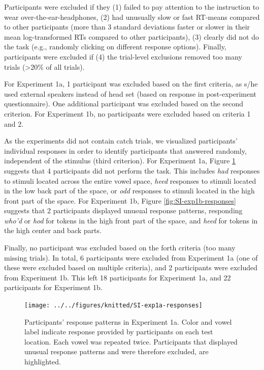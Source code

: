 \documentclass[preprint]{JASA}
\begin{document}
Participants were excluded if they (1) failed to pay attention to the instruction to wear over-the-ear-headphones, (2) had unusually slow or fast RT-means compared to other participants (more than 3 standard deviations faster or slower in their mean log-transformed RTs compared to other participants), (3) clearly did not do the task (e.g., randomly clicking on different response options). Finally, participants were excluded if (4) the trial-level exclusions removed too many trials (\textgreater20\% of all trials).

For Experiment 1a, 1 participant was excluded based on the first criteria, as s/he used external speakers instead of head set (based on response in post-experiment questionnaire). One additional participant was excluded based on the second criterion. For Experiment 1b, no participants were excluded based on criteria 1 and 2.

As the experiments did not contain catch trials, we visualized participants' individual responses in order to identify participants that answered randomly, independent of the stimulus (third criterion). For Experiment 1a, Figure \ref{fig:SI-exp1a-responses} suggests that 4 participants did not perform the task. This includes \emph{had} responses to stimuli located across the entire vowel space, \emph{heed} responses to stimuli located in the low back part of the space, or \emph{odd} responses to stimuli located in the high front part of the space. For Experiment 1b, Figure \ref{fig:SI-exp1b-responses} suggests that 2 participants displayed unusual response patterns, responding \emph{who'd} or \emph{hod} for tokens in the high front part of the space, and \emph{heed} for tokens in the high center and back parts.

Finally, no participant was excluded based on the forth criteria (too many missing trials). In total, 6 participants were excluded from Experiment 1a (one of these were excluded based on multiple criteria), and 2 participants were excluded from Experiment 1b. This left 18 participants for Experiment 1a, and 22 participants for Experiment 1b.





\begin{figure}[!ht]

{\centering \texttt{[image: ../../figures/knitted/SI-exp1a-responses]} 

}

\caption{Participants' response patterns in Experiment 1a. Color and vowel label indicate response provided by participants on each test location. Each vowel was repeated twice. Participants that displayed unusual response patterns and were therefore excluded, are highlighted.}\label{fig:SI-exp1a-responses}
\end{figure}
\end{document}
